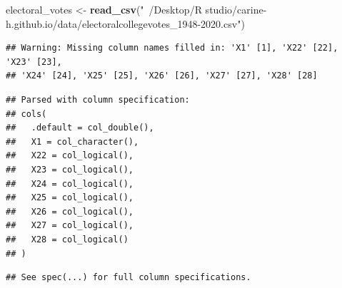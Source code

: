 \documentclass[
]{article}
\newenvironment{Shaded}{\begin{snugshade}}{\end{snugshade}}
\newcommand{\CommentTok}[1]{\textcolor[rgb]{0.56,0.35,0.01}{\textit{#1}}}
\newcommand{\DataTypeTok}[1]{\textcolor[rgb]{0.13,0.29,0.53}{#1}}
\newcommand{\DecValTok}[1]{\textcolor[rgb]{0.00,0.00,0.81}{#1}}
\newcommand{\KeywordTok}[1]{\textcolor[rgb]{0.13,0.29,0.53}{\textbf{#1}}}
\newcommand{\NormalTok}[1]{#1}
\newcommand{\OperatorTok}[1]{\textcolor[rgb]{0.81,0.36,0.00}{\textbf{#1}}}
\newcommand{\StringTok}[1]{\textcolor[rgb]{0.31,0.60,0.02}{#1}}
\begin{document}
\begin{Shaded}
\begin{Highlighting}[]
\NormalTok{electoral_votes <-}\StringTok{ }\KeywordTok{read_csv}\NormalTok{(}\StringTok{"~/Desktop/R studio/carine-h.github.io/data/electoralcollegevotes_1948-2020.csv"}\NormalTok{)}
\end{Highlighting}
\end{Shaded}

\begin{verbatim}
## Warning: Missing column names filled in: 'X1' [1], 'X22' [22], 'X23' [23],
## 'X24' [24], 'X25' [25], 'X26' [26], 'X27' [27], 'X28' [28]
\end{verbatim}

\begin{verbatim}
## Parsed with column specification:
## cols(
##   .default = col_double(),
##   X1 = col_character(),
##   X22 = col_logical(),
##   X23 = col_logical(),
##   X24 = col_logical(),
##   X25 = col_logical(),
##   X26 = col_logical(),
##   X27 = col_logical(),
##   X28 = col_logical()
## )
\end{verbatim}

\begin{verbatim}
## See spec(...) for full column specifications.
\end{verbatim}

\begin{Shaded}
\end{Shaded}
\end{document}
